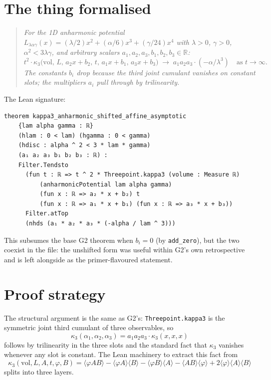\documentclass[11pt]{article}
\begin{document}
\section{The thing formalised}

\begin{quote}\itshape
For the 1D anharmonic potential $L_{\lambda\alpha\gamma}(x) =
(\lambda/2)x^2 + (\alpha/6)x^3 + (\gamma/24)x^4$ with $\lambda > 0$,
$\gamma > 0$, $\alpha^2 < 3\lambda\gamma$, and arbitrary scalars
$a_1, a_2, a_3, b_1, b_2, b_3 \in \mathbb{R}$:
\[
  t^2 \cdot \kappa_3\bigl(\mathrm{vol},\,L,\,a_2 x + b_2,\,t,\,a_1 x +
  b_1,\,a_3 x + b_3\bigr) \;\longrightarrow\; a_1 a_2 a_3 \cdot
  (-\alpha/\lambda^3) \quad\text{as } t \to \infty.
\]
The constants $b_i$ drop because the third joint cumulant vanishes
on constant slots; the multipliers $a_i$ pull through by trilinearity.
\end{quote}

\noindent The Lean signature:
\begin{verbatim}
theorem kappa3_anharmonic_shifted_affine_asymptotic
    {lam alpha gamma : ℝ}
    (hlam : 0 < lam) (hgamma : 0 < gamma)
    (hdisc : alpha ^ 2 < 3 * lam * gamma)
    (a₁ a₂ a₃ b₁ b₂ b₃ : ℝ) :
    Filter.Tendsto
      (fun t : ℝ => t ^ 2 * Threepoint.kappa3 (volume : Measure ℝ)
          (anharmonicPotential lam alpha gamma)
          (fun x : ℝ => a₂ * x + b₂) t
          (fun x : ℝ => a₁ * x + b₁) (fun x : ℝ => a₃ * x + b₃))
      Filter.atTop
      (nhds (a₁ * a₂ * a₃ * (-alpha / lam ^ 3)))
\end{verbatim}

This subsumes the base G2 theorem when $b_i = 0$ (by
\texttt{add\_zero}), but the two coexist in the file: the unshifted
form was useful within G2's own retrospective and is left alongside as
the primer-flavoured statement.

\section{Proof strategy}

The structural argument is the same as G2's: \texttt{Threepoint.kappa3}
is the symmetric joint third cumulant of three observables, so
\[
  \kappa_3(\alpha_1, \alpha_2, \alpha_3) = a_1 a_2 a_3 \cdot
  \kappa_3(x, x, x)
\]
follows by trilinearity in the three slots and the standard fact that
$\kappa_3$ vanishes whenever any slot is constant. The Lean machinery
to extract this fact from
\[
  \kappa_3(\mathrm{vol}, L, A, t, \varphi, B) = \langle \varphi A B
  \rangle - \langle \varphi A \rangle \langle B \rangle - \langle
  \varphi B \rangle \langle A \rangle - \langle A B \rangle \langle
  \varphi \rangle + 2 \langle \varphi \rangle \langle A \rangle
  \langle B \rangle
\]
splits into three layers.
\end{document}
